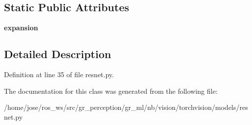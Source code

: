 \subsection*{Static Public Attributes}
\begin{DoxyCompactItemize}
\item 
\mbox{\label{classtorchvision_1_1models_1_1resnet_1_1BasicBlock_ab6c28d9436782a51be57424479d79830}} 
{\bfseries expansion}
\end{DoxyCompactItemize}


\subsection{Detailed Description}


Definition at line 35 of file resnet.\+py.



The documentation for this class was generated from the following file\+:\begin{DoxyCompactItemize}
\item 
/home/jose/ros\+\_\+ws/src/gr\+\_\+perception/gr\+\_\+ml/nb/vision/torchvision/models/resnet.\+py\end{DoxyCompactItemize}
